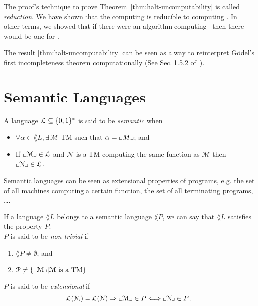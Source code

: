 \begin{remark}
	The proof's technique to prove Theorem~\ref{thm:halt-uncomputability} is called \emph{reduction}. We have shown that the computing \UC is reducible to computing \HALT. In other terms, we showed that if there were an algorithm computing \HALT~then there would be one for \UC.
	\label{rmk:reduction}
\end{remark}
\begin{remark}
	The result \ref{thm:halt-uncomputability} can be seen as a way to reinterpret Gödel's first incompleteness theorem computationally (See Sec. 1.5.2 of~\citet{Arora2009}).
\end{remark}

\section{Semantic Languages}

\begin{definition}
	A language $\mathcal{L} \subseteq \{ 0,1 \}^* $ is said to be \emph{semantic} when
	\begin{itemize}
		\item $\forall \alpha \in \lang{L}, \exists \, \mathcal{M}$ TM such that $\alpha = \llcorner M \lrcorner$; and
		\item If $\llcorner \mathcal{M} \lrcorner \in \mathcal{L}$ and $\mathcal{N}$ is a TM computing the same function as $\mathcal{M}$ then $\llcorner \mathcal{N} \lrcorner \in \mathcal{L}$.
		      \label{def:semantic-language}
	\end{itemize}
\end{definition}
\begin{remark}
	Semantic languages can be seen as extensional properties of programs, e.g. the set of all machines computing a certain function, the set of all terminating programs, \ldots.

\end{remark}

\begin{definition}[Property]
	If a language \(\lang{L}\) belongs to a semantic language \(\lang{P}\), we can say that \(\lang{L}\) satisfies the property \( P\). \\
	$P$ is said to be \emph{non-trivial} if
	\begin{enumerate}
		\item \(\lang{P} \neq \emptyset\); and
		\item \(\mathcal{P} \neq \{  \llcorner \mathcal{M} \lrcorner  | \mathcal{M} \text{ is a TM} \} \)
	\end{enumerate}
	$P$ is said to be \emph{extensional} if
	\[
		\mathcal{L}(\mathcal{M}) = \mathcal{L}(\mathcal{N}) \Rightarrow \llcorner \mathcal{M} \lrcorner \in P \Longleftrightarrow \llcorner \mathcal{N} \lrcorner \in P \, .
	\]
\end{definition}


